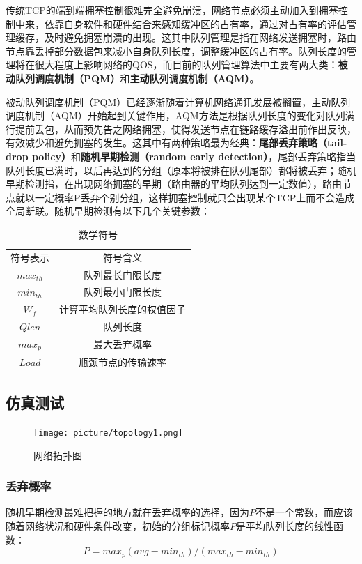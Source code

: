 \documentclass{article}
\begin{document}
传统TCP的端到端拥塞控制很难完全避免崩溃，网络节点必须主动加入到拥塞控制中来，依靠自身软件和硬件结合来感知缓冲区的占有率，通过对占有率的评估管理缓存，及时避免拥塞崩溃的出现。这其中队列管理是指在网络发送拥塞时，路由节点靠丢掉部分数据包来减小自身队列长度，调整缓冲区的占有率。队列长度的管理将在很大程度上影响网络的QOS，而目前的队列管理算法中主要有两大类：\textbf{被动队列调度机制（PQM）}和\textbf{主动队列调度机制（AQM）}。

被动队列调度机制（PQM）已经逐渐随着计算机网络通讯发展被搁置，主动队列调度机制（AQM）开始起到关键作用，AQM方法是根据队列长度的变化对队列满行提前丢包，从而预先告之网络拥塞，使得发送节点在链路缓存溢出前作出反映，有效减少和避免拥塞的发生。这其中有两种策略最为经典：\textbf{尾部丢弃策略（tail-drop policy）}和\textbf{随机早期检测（random early detection）}，尾部丢弃策略指当队列长度已满时，以后再达到的分组（原本将被排在队列尾部）都将被丢弃；随机早期检测指，在出现网络拥塞的早期（路由器的平均队列达到一定数值），路由节点就以一定概率P丢弃个别分组，这样拥塞控制就只会出现某个TCP上而不会造成全局断联。随机早期检测有以下几个关键参数：

\begin{table}[H]
	\centering
	\caption{数学符号}
	\label{table}
	\begin{tabular}{cc}
		\hline
		符号表示&符号含义\\
		$max_{th}$ & 队列最长门限长度\\
		$min_{th}$ & 队列最小门限长度\\
		$W_f$ & 计算平均队列长度的权值因子\\
		$Qlen$ & 队列长度\\
		$max_p$ & 最大丢弃概率\\
		$Load$ & 瓶颈节点的传输速率\\
		\hline
	\end{tabular}
\end{table}

\subsection{仿真测试}

\begin{figure}[H]
	\centering
	\texttt{[image: picture/topology1.png]}
	\caption{网络拓扑图}
	\label{fig:topology1}
\end{figure}

\subsubsection{丢弃概率}
随机早期检测最难把握的地方就在丢弃概率的选择，因为$P$不是一个常数，而应该随着网络状况和硬件条件改变，初始的分组标记概率$P$是平均队列长度的线性函数：
\begin{equation}
	P=max_p(avg-min_{th})/(max_{th}-min_{th})
\end{equation}
\end{document}
